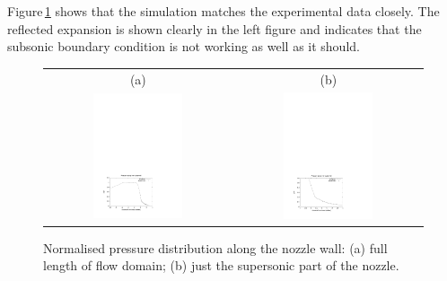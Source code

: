 Figure\,\ref{back-profile-fig} shows that the simulation matches the
experimental data closely.
The reflected expansion is shown clearly in the left figure and indicates 
that the subsonic boundary condition is not working as well as it should.


\begin{figure}[htbp]
\begin{center}
\begin{tabular}{cc}
(a) & (b) \\
\includegraphics[width=0.5\textwidth,viewport=65 54 398 291,clip=true]{../2D/back-nozzle/back_profile_whole.pdf} &
\includegraphics[width=0.5\textwidth,viewport=65 54 398 291,clip=true]{../2D/back-nozzle/back_profile_supersonic.pdf}
\end{tabular}
\end{center}
\caption{Normalised pressure distribution along the nozzle wall:
         (a) full length of flow domain; 
	 (b) just the supersonic part of the nozzle.}
\label{back-profile-fig}
\end{figure}

